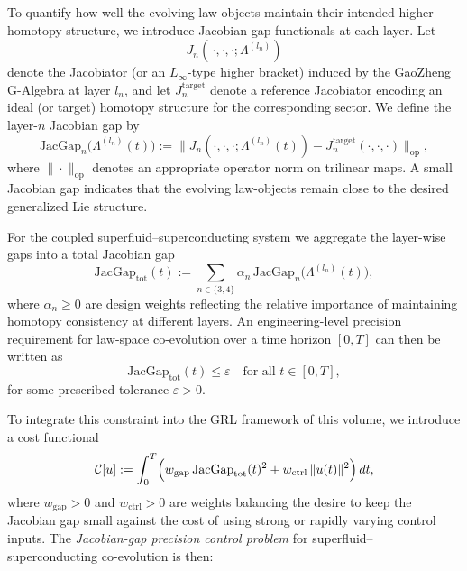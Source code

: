 \documentclass[11pt]{book}
\theoremstyle{plain}
\theoremstyle{definition}
\theoremstyle{remark}
\begin{document}
To quantify how well the evolving law-objects maintain their intended
higher homotopy structure, we introduce Jacobian-gap functionals at each
layer. Let
\begin{equation}
  J_n(\,\cdot,\cdot,\cdot;\Lambda^{(l_n)})
\end{equation}
denote the Jacobiator (or an $L_\infty$-type higher bracket) induced by
the GaoZheng G-Algebra at layer $l_n$, and let
$J_n^{\mathrm{target}}$ denote a reference Jacobiator encoding an ideal
(or target) homotopy structure for the corresponding sector. We define
the layer-$n$ Jacobian gap by
\begin{equation}
  \mathrm{JacGap}_n\bigl(\Lambda^{(l_n)}(t)\bigr)
  :=
  \bigl\|
    J_n(\cdot,\cdot,\cdot;\Lambda^{(l_n)}(t))
    -
    J_n^{\mathrm{target}}(\cdot,\cdot,\cdot)
  \bigr\|_{\mathrm{op}},
\end{equation}
where $\|\cdot\|_{\mathrm{op}}$ denotes an appropriate operator norm on
trilinear maps. A small Jacobian gap indicates that the evolving
law-objects remain close to the desired generalized Lie structure.

For the coupled superfluid--superconducting system we aggregate the
layer-wise gaps into a total Jacobian gap
\begin{equation}
  \mathrm{JacGap}_{\mathrm{tot}}(t)
  :=
  \sum_{n\in\{3,4\}}
    \alpha_n\,
    \mathrm{JacGap}_n\bigl(\Lambda^{(l_n)}(t)\bigr),
\end{equation}
where $\alpha_n \ge 0$ are design weights reflecting the relative
importance of maintaining homotopy consistency at different layers. An
engineering-level precision requirement for law-space co-evolution over
a time horizon $[0,T]$ can then be written as
\begin{equation}
  \mathrm{JacGap}_{\mathrm{tot}}(t)
  \le \varepsilon
  \quad
  \text{for all } t\in[0,T],
  \label{eq:jacobian-gap-tolerance}
\end{equation}
for some prescribed tolerance $\varepsilon > 0$.

To integrate this constraint into the GRL framework of this volume, we
introduce a cost functional
\begin{equation}
  \mathcal{C}[u]
  :=
  \int_0^T
  \Bigl(
    w_{\mathrm{gap}}\,
    \mathrm{JacGap}_{\mathrm{tot}}(t)^2
    +
    w_{\mathrm{ctrl}}\,
    \|u(t)\|^2
  \Bigr)\,dt,
  \label{eq:jacobian-gap-cost}
\end{equation}
where $w_{\mathrm{gap}} > 0$ and $w_{\mathrm{ctrl}} > 0$ are weights
balancing the desire to keep the Jacobian gap small against the cost of
using strong or rapidly varying control inputs. The \emph{Jacobian-gap
precision control problem} for superfluid--superconducting co-evolution
is then:
\end{document}
